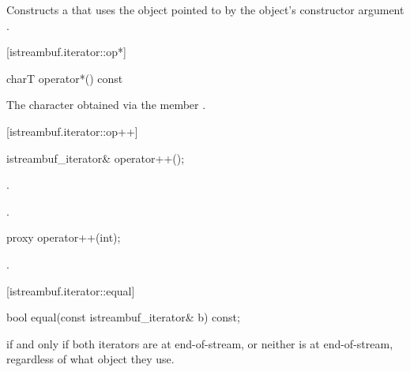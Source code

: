 \begin{itemdescr}
\pnum
\effects
Constructs a
that uses the
object pointed to by the
object's constructor argument .
\end{itemdescr}

[istreambuf.iterator::op*]{}

%
\begin{itemdecl}
charT operator*() const
\end{itemdecl}

\begin{itemdescr}
\pnum
\returns
The character obtained via the
member
.
\end{itemdescr}

[istreambuf.iterator::op++]{}

%
\begin{itemdecl}
istreambuf_iterator& operator++();
\end{itemdecl}

\begin{itemdescr}
\pnum
\effects
{}.

\pnum
\returns
{}.
\end{itemdescr}

%
%
\begin{itemdecl}
proxy operator++(int);
\end{itemdecl}

\begin{itemdescr}
\pnum
\returns
{}.
\end{itemdescr}

[istreambuf.iterator::equal]{}

%
\begin{itemdecl}
bool equal(const istreambuf_iterator& b) const;
\end{itemdecl}

\begin{itemdescr}
\pnum
\returns
{}
if and only if both iterators are at end-of-stream,
or neither is at end-of-stream, regardless of what
object they use.
\end{itemdescr}

